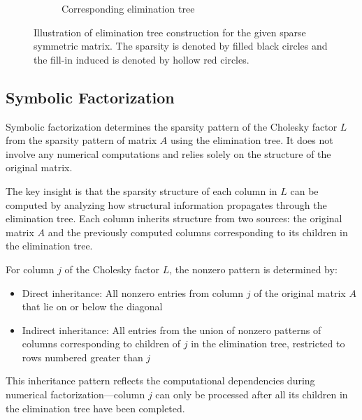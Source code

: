 \begin{figure}[htbp]
\begin{subfigure}[b]{0.45\textwidth}
        \caption{Corresponding elimination tree}
        \label{fig:etree-visualization}
    \end{subfigure}
    \caption{Illustration of elimination tree construction for the given sparse symmetric matrix. The sparsity is denoted by filled black circles and the fill-in induced is denoted by hollow red circles.}
    \label{fig:elimination-tree-example}
\end{figure}


\subsection{Symbolic Factorization}

Symbolic factorization determines the sparsity pattern of the Cholesky factor $L$ from the sparsity pattern of matrix $A$ using the elimination tree. It does not involve any numerical computations and relies solely on the structure of the original matrix.

The key insight is that the sparsity structure of each column in $L$ can be computed by analyzing how structural information propagates through the elimination tree. Each column inherits structure from two sources: the original matrix $A$ and the previously computed columns corresponding to its children in the elimination tree.

\begin{definition}
For column $j$ of the Cholesky factor $L$, the nonzero pattern is determined by:
\begin{itemize}
    \item Direct inheritance: All nonzero entries from column $j$ of the original matrix $A$ that lie on or below the diagonal
    \item Indirect inheritance: All entries from the union of nonzero patterns of columns corresponding to children of $j$ in the elimination tree, restricted to rows numbered greater than $j$
\end{itemize}
\end{definition}

This inheritance pattern reflects the computational dependencies during numerical factorization—column $j$ can only be processed after all its children in the elimination tree have been completed.

